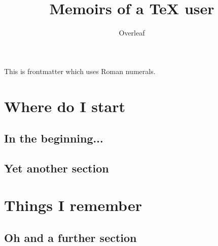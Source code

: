 \documentclass{book}
\title{Memoirs of a \TeX{} user}
\author{Overleaf}
\begin{document}
	
	\frontmatter
	\maketitle
	This is frontmatter which uses Roman numerals.
	
	\mainmatter
	\chapter{Where do I start}
	\lipsum[4]
	
	\section{In the beginning...}
	\lipsum[1]
	
	\section{Yet another section}
	\lipsum[1]
	
	\chapter{Things I remember}
	
	\section{Oh and a further section}
	\lipsum[1]
\end{document}
